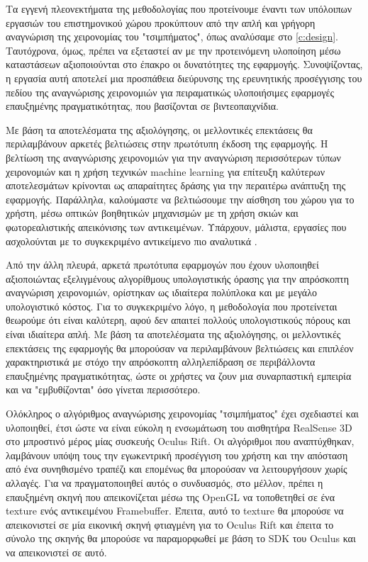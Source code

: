 

Τα εγγενή πλεονεκτήματα της μεθοδολογίας που προτείνουμε έναντι των υπόλοιπων εργασιών του επιστημονικού χώρου προκύπτουν από την απλή και γρήγορη αναγνώριση της χειρονομίας του "τσιμπήματος", όπως αναλύσαμε στο \ref{c:design}. Ταυτόχρονα, όμως, πρέπει να εξεταστεί αν με την προτεινόμενη υλοποίηση μέσω καταστάσεων αξιοποιούνται στο έπακρο οι δυνατότητες της εφαρμογής. Συνοψίζοντας, η εργασία αυτή αποτελεί μια προσπάθεια διεύρυνσης της ερευνητικής προσέγγισης του πεδίου της αναγνώρισης χειρονομιών για πειραματικώς υλοποιήσιμες εφαρμογές επαυξημένης πραγματικότητας, που βασίζονται σε βιντεοπαιχνίδια.



Με βάση τα αποτελέσματα της αξιολόγησης, οι μελλοντικές επεκτάσεις θα περιλαμβάνουν αρκετές βελτιώσεις στην πρωτότυπη έκδοση της εφαρμογής. Η βελτίωση της αναγνώρισης χειρονομιών για την αναγνώριση περισσότερων τύπων χειρονομιών και η χρήση τεχνικών machine learning για επίτευξη καλύτερων αποτελεσμάτων κρίνονται ως απαραίτητες δράσης για την περαιτέρω ανάπτυξη της εφαρμογής. Παράλληλα, καλούμαστε να βελτιώσουμε την αίσθηση του χώρου για το χρήστη, μέσω οπτικών βοηθητικών μηχανισμών με τη χρήση σκιών και φωτορεαλιστικής απεικόνισης των αντικειμένων. Υπάρχουν, μάλιστα, εργασίες που ασχολούνται με το συγκεκριμένο αντικείμενο πιο αναλυτικά \cite{Kruijff2010} \cite{Ha2014} \cite{Prachyabrued2014}.



Από την άλλη πλευρά, αρκετά πρωτότυπα εφαρμογών που έχουν υλοποιηθεί αξιοποιώντας εξελιγμένους αλγορίθμους υπολογιστικής όρασης για την απρόσκοπτη αναγνώριση χειρονομιών, ορίστηκαν ως ιδιαίτερα πολύπλοκα και με μεγάλο υπολογιστικό κόστος. Για το συγκεκριμένο λόγο, η μεθοδολογία που προτείνεται θεωρούμε ότι είναι καλύτερη, αφού δεν απαιτεί πολλούς υπολογιστικούς πόρους και είναι ιδιαίτερα απλή. Με βάση τα αποτελέσματα της αξιολόγησης, οι μελλοντικές επεκτάσεις της εφαρμογής θα μπορούσαν να περιλαμβάνουν βελτιώσεις και επιπλέον χαρακτηριστικά με στόχο την απρόσκοπτη αλληλεπίδραση σε περιβάλλοντα επαυξημένης πραγματικότητας, ώστε οι χρήστες να ζουν μια συναρπαστική εμπειρία και να "εμβυθίζονται" όσο γίνεται περισσότερο. 





Ολόκληρος ο αλγόριθμος αναγνώρισης χειρονομίας "τσιμπήματος" έχει σχεδιαστεί και υλοποιηθεί, έτσι ώστε να είναι εύκολη η ενσωμάτωση του αισθητήρα RealSense 3D στο μπροστινό μέρος μίας συσκευής Oculus Rift. Οι αλγόριθμοι που αναπτύχθηκαν, λαμβάνουν υπόψη τους την εγωκεντρική προσέγγιση του χρήστη και την απόσταση από ένα συνηθισμένο τραπέζι και επομένως θα μπορούσαν να λειτουργήσουν χωρίς αλλαγές. Για να πραγματοποιηθεί αυτός ο συνδυασμός, στο μέλλον, πρέπει η επαυξημένη σκηνή που απεικονίζεται μέσω της OpenGL να τοποθετηθεί σε ένα texture ενός αντικειμένου Framebuffer. Έπειτα, αυτό το texture θα μπορούσε να απεικονιστεί σε μία εικονική σκηνή φτιαγμένη για το Oculus Rift και έπειτα το σύνολο της σκηνής θα μπορούσε να παραμορφωθεί με βάση το SDK του Oculus και να απεικονιστεί σε αυτό. 


